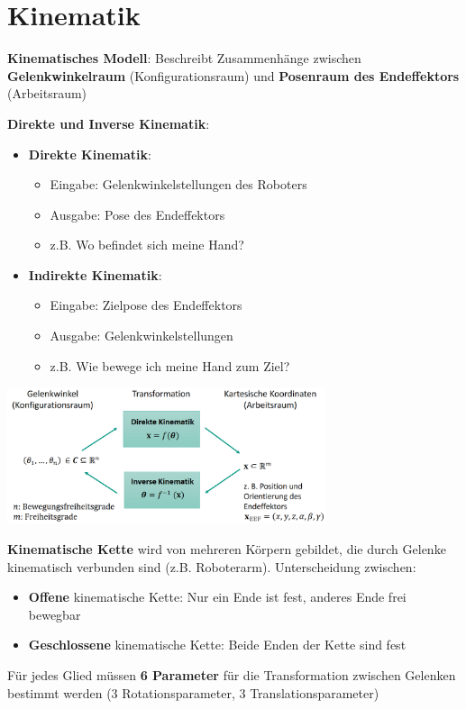 \section{Kinematik}

\textbf{Kinematisches Modell}: Beschreibt Zusammenhänge zwischen \textbf{Gelenkwinkelraum} (Konfigurationsraum) und \textbf{Posenraum des Endeffektors} (Arbeitsraum)

\textbf{Direkte und Inverse Kinematik}:
\begin{itemize}
	\item \textbf{Direkte Kinematik}: 
	\begin{itemize}
		\item Eingabe: Gelenkwinkelstellungen des Roboters
		\item Ausgabe: Pose des Endeffektors
		\item z.B. Wo befindet sich meine Hand?
	\end{itemize}
	\item \textbf{Indirekte Kinematik}: 
	\begin{itemize}
		\item Eingabe: Zielpose des Endeffektors
		\item Ausgabe: Gelenkwinkelstellungen
		\item z.B. Wie bewege ich meine Hand zum Ziel?
	\end{itemize}
\end{itemize}
\begin{center}
	\includegraphics[width=0.7\textwidth]{images/kinematik.png}
\end{center}
\medskip
\textbf{Kinematische Kette} wird von mehreren Körpern gebildet, die durch Gelenke kinematisch verbunden sind (z.B. Roboterarm). Unterscheidung zwischen:
\begin{itemize}
	\item \textbf{Offene} kinematische Kette: Nur ein Ende ist fest, anderes Ende frei bewegbar
	\item \textbf{Geschlossene} kinematische Kette: Beide Enden der Kette sind fest
\end{itemize}
Für jedes Glied müssen \textbf{6 Parameter} für die Transformation zwischen Gelenken bestimmt werden (3 Rotationsparameter, 3 Translationsparameter)
\pagebreak

